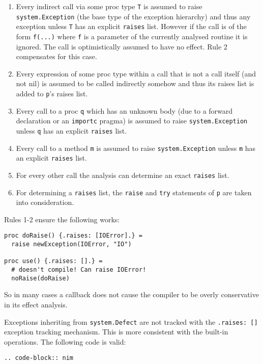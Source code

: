 \begin{enumerate}
\def\labelenumi{\arabic{enumi}.}
\tightlist
\item
  Every indirect call via some proc type \texttt{T} is assumed to raise
  \texttt{system.Exception} (the base type of the exception hierarchy)
  and thus any exception unless \texttt{T} has an explicit
  \texttt{raises} list. However if the call is of the form
  \texttt{f(...)} where \texttt{f} is a parameter of the currently
  analysed routine it is ignored. The call is optimistically assumed to
  have no effect. Rule 2 compensates for this case.
\item
  Every expression of some proc type within a call that is not a call
  itself (and not nil) is assumed to be called indirectly somehow and
  thus its raises list is added to \texttt{p}'s raises list.
\item
  Every call to a proc \texttt{q} which has an unknown body (due to a
  forward declaration or an \texttt{importc} pragma) is assumed to raise
  \texttt{system.Exception} unless \texttt{q} has an explicit
  \texttt{raises} list.
\item
  Every call to a method \texttt{m} is assumed to raise
  \texttt{system.Exception} unless \texttt{m} has an explicit
  \texttt{raises} list.
\item
  For every other call the analysis can determine an exact
  \texttt{raises} list.
\item
  For determining a \texttt{raises} list, the \texttt{raise} and
  \texttt{try} statements of \texttt{p} are taken into consideration.
\end{enumerate}

Rules 1-2 ensure the following works:

\begin{verbatim}
proc doRaise() {.raises: [IOError].} =
  raise newException(IOError, "IO")

proc use() {.raises: [].} =
  # doesn't compile! Can raise IOError!
  noRaise(doRaise)
\end{verbatim}

So in many cases a callback does not cause the compiler to be overly
conservative in its effect analysis.

Exceptions inheriting from \texttt{system.Defect} are not tracked with
the \texttt{.raises:\ {[}{]}} exception tracking mechanism. This is more
consistent with the built-in operations. The following code is valid:

\begin{verbatim}
.. code-block:: nim
\end{verbatim}

